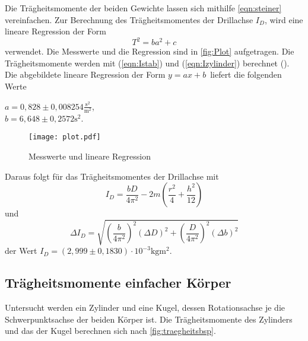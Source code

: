 \sloppy
Die Trägheitsmomente der beiden Gewichte lassen sich mithilfe \autoref{eqn:steiner} vereinfachen. Zur Berechnung
des Trägheitsmomentes der Drillachse $I_D$, wird eine lineare Regression der Form
\begin{equation}
  \label{eqn:linReg}
  T^2 = ba^2+c
\end{equation}
verwendet.
Die Messwerte und die Regression sind in \autoref{fig:Plot} aufgetragen. Die Trägheitsmomente werden mit 
(\ref{eqn:Istab}) und (\ref{eqn:Izylinder}) berechnet (\cite{Anleitung}).
Die abgebildete lineare Regression der Form $ y = ax + b \,$ liefert die folgenden Werte
\begin{center}
  $ a = 0,828 \pm 0,008254 \frac{\si{\s^2}}{\si{\m^2}}$, \\
  $ b = 6,648 \pm 0,2572 \si{\s^2}$. \\
\end{center}

\begin{figure}[H]
  \centering
  \texttt{[image: plot.pdf]}
  \caption{Messwerte und lineare Regression}
  \label{fig:Plot}
\end{figure}
Daraus folgt für das Trägheitsmomentes der Drillachse mit
\begin{equation*}
  I_D = \frac{bD}{4 \pi ^2} - 2m (\frac{r^2}{4} + \frac{h^2}{12})
\end{equation*}
und
\begin{equation*}
  \Delta I_D = \sqrt{(\frac{b}{4 \pi ^2})^2  (\Delta D)^2 + (\frac{D}{4 \pi ^2})^2  (\Delta b)^2}
\end{equation*}
der Wert $I_D = (2,999 \pm 0,1830) \cdot 10^{-3} \si{\kilogram\meter^2}$.

\subsection{Trägheitsmomente einfacher Körper}
\label{sec:Trägheitsmomente einfacher Körper}

Untersucht werden ein Zylinder und eine Kugel, dessen Rotationsachse je die Schwerpunktsachse der beiden Körper ist.
Die Trägheitsmomente des Zylinders und das der Kugel berechnen sich nach \autoref{fig:traegheitsbsp}.





